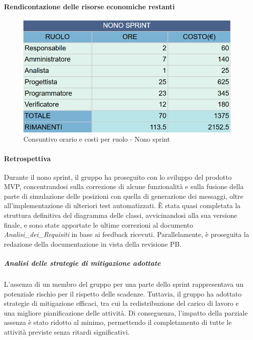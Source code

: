\documentclass[10pt]{article}
\begin{document}
{{{{{{{{{{        \paragraph{Rendicontazione delle risorse economiche restanti}\mbox{}\vspace{0.4em}
        \begin{figure}[H]
            \centering
            \includegraphics[width=0.6\linewidth]{oreCostiNonoSprint.png}
            \caption{Consuntivo orario e costi per ruolo - Nono sprint}
            \label{fig:Consuntivo orario e costi per ruolo - Nono sprint}
        \end{figure}
        
        \paragraph{Retrospettiva}\mbox{}\vspace{0.4em}
        
        Durante il nono sprint, il gruppo ha proseguito con lo sviluppo del prodotto MVP, concentrandosi sulla correzione di alcune funzionalità e sulla fusione della parte di simulazione delle posizioni con quella di generazione dei messaggi, oltre all'implementazione di ulteriori test automatizzati. È stata quasi completata la struttura definitiva del diagramma delle classi, avvicinandosi alla sua versione finale, e sono state apportate le ultime correzioni al documento \textit{Analisi\_dei\_Requisiti} in base ai feedback ricevuti. Parallelamente, è proseguita la redazione della documentazione in vista della revisione PB.

        \subparagraph{Analisi delle strategie di mitigazione adottate}\mbox{}\vspace{0.4em}
        
        L'assenza di un membro del gruppo per una parte dello sprint rappresentava un potenziale rischio per il rispetto delle scadenze. Tuttavia, il gruppo ha adottato strategie di mitigazione efficaci, tra cui la redistribuzione del carico di lavoro e una migliore pianificazione delle attività. Di conseguenza, l'impatto della parziale assenza è stato ridotto al minimo, permettendo il completamento di tutte le attività previste senza ritardi significativi.

}}}}}}}}}}
\end{document}
